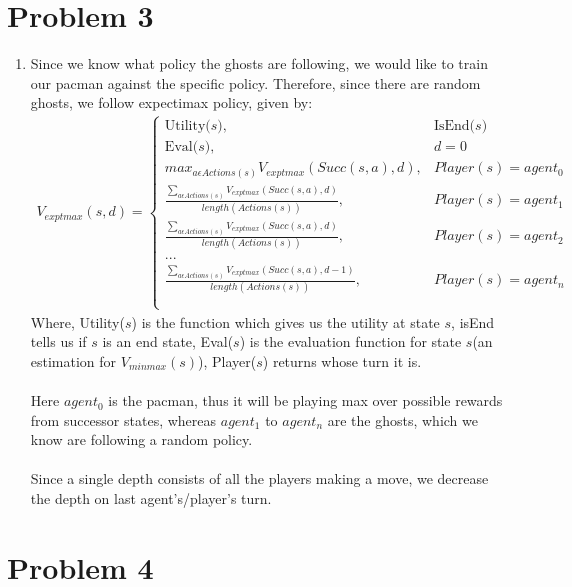 \documentclass[12pt]{article}
\begin{document}
\section*{Problem 3}

\begin{enumerate}[label=(\alph*)]
  \item Since we know what policy the ghosts are following, we would like to train our pacman against the specific policy. Therefore, since there are random ghosts, we follow expectimax policy, given by:
  \begin{align*}
    V_{exptmax}(s, d) = \begin{cases} 
  \text{Utility($s$)}, & \text{IsEnd($s$)} \\
  \text{Eval($s$)}, & d = 0 \\
  max_{a\epsilon Actions(s)} V_{exptmax}(Succ(s, a), d), & Player(s) = agent_0 \\
  \frac{\sum_{a\epsilon Actions(s)} V_{exptmax}(Succ(s, a), d)}{length(Actions(s))}, & Player(s) = agent_1 \\
  \frac{\sum_{a\epsilon Actions(s)} V_{exptmax}(Succ(s, a), d)}{length(Actions(s))}, & Player(s) = agent_2 \\
  ... \\
  \frac{\sum_{a\epsilon Actions(s)} V_{exptmax}(Succ(s, a), d - 1)}{length(Actions(s))}, & Player(s) = agent_n \\ \\
  \end{cases}
  \end{align*}
    Where, Utility($s$) is the function which gives us the utility at state $s$, isEnd tells us if $s$ is an end state, Eval($s$) is the evaluation function for state $s$(an estimation for $V_{minmax}(s)$), Player($s$) returns whose turn it is. \\ \\
  Here $agent_0$ is the pacman, thus it will be playing max over possible rewards from successor states, whereas $agent_1$ to $agent_n$ are the ghosts, which we know are following a random policy. \\ \\
  Since a single depth consists of all the players making a move, we decrease the depth on last agent's/player's turn.
\end{enumerate}

\section*{Problem 4}
\end{document}
